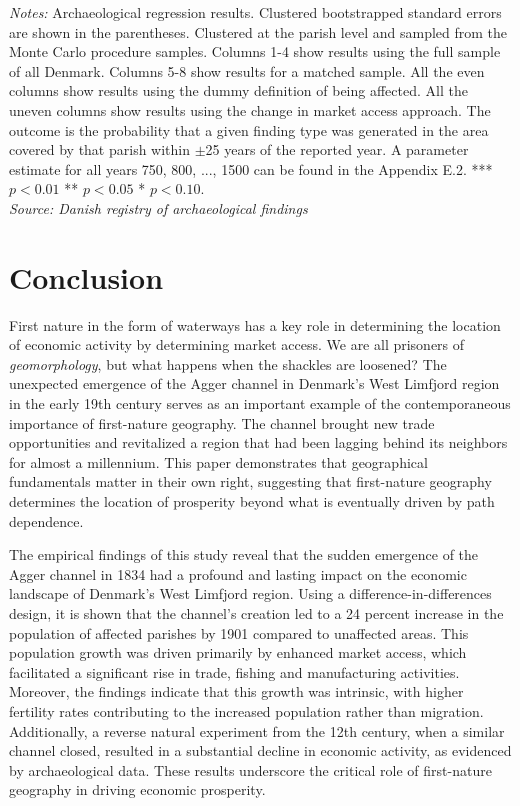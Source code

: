 \documentclass[11pt]{article}
\begin{document}
\begin{landscape}
\begin{table}
{\caption*{\footnotesize \textit{Notes:} Archaeological regression results. Clustered bootstrapped standard errors are shown in the parentheses. Clustered at the parish level and sampled from the Monte Carlo procedure samples. Columns 1-4 show results using the full sample of all Denmark. Columns 5-8 show results for a matched sample. All the even columns show results using the dummy definition of being affected. All the uneven columns show results using the change in market access approach. The outcome is the probability that a given finding type was generated in the area covered by that parish within $\pm$25 years of the reported year. A parameter estimate for all years 750, 800, ..., 1500 can be found in the Appendix E.2. *** $p< 0.01$ ** $p< 0.05$ * $p< 0.10$. \\ \textit{Source: Danish registry of archaeological findings}}
}
\end{table}
\end{landscape}

\FloatBarrier
\section{Conclusion}
First nature in the form of waterways has a key role in determining the location of economic activity by determining market access. We are all prisoners of \textit{geomorphology}, but what happens when the shackles are loosened? The unexpected emergence of the Agger channel in Denmark's West Limfjord region in the early 19th century serves as an important example of the contemporaneous importance of first-nature geography. The channel brought new trade opportunities and revitalized a region that had been lagging behind its neighbors for almost a millennium. This paper demonstrates that geographical fundamentals matter in their own right, suggesting that first-nature geography determines the location of prosperity beyond what is eventually driven by path dependence.

The empirical findings of this study reveal that the sudden emergence of the Agger channel in 1834 had a profound and lasting impact on the economic landscape of Denmark's West Limfjord region. Using a difference-in-differences design, it is shown that the channel's creation led to a 24 percent increase in the population of affected parishes by 1901 compared to unaffected areas. This population growth was driven primarily by enhanced market access, which facilitated a significant rise in trade, fishing and manufacturing activities. Moreover, the findings indicate that this growth was intrinsic, with higher fertility rates contributing to the increased population rather than migration. Additionally, a reverse natural experiment from the 12th century, when a similar channel closed, resulted in a substantial decline in economic activity, as evidenced by archaeological data. These results underscore the critical role of first-nature geography in driving economic prosperity.
\end{document}
